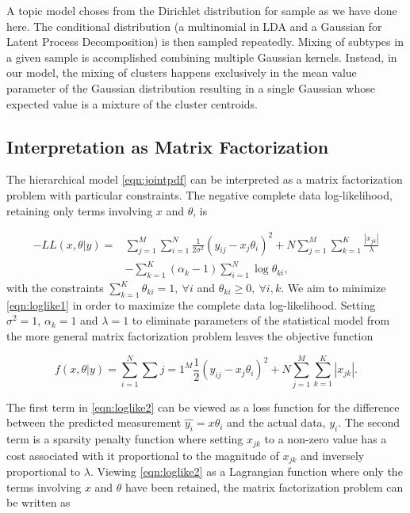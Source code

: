 \documentclass[11pt]{amsart}
\begin{document}
A topic model choses from the Dirichlet distribution for sample as we have done here. The conditional distribution (a multinomial in LDA and a Gaussian for Latent Process Decomposition) is then sampled repeatedly. Mixing of subtypes in a given sample is accomplished  combining multiple Gaussian kernels. Instead, in our model, the mixing of clusters happens exclusively in the mean value parameter of the Gaussian distribution resulting in a single Gaussian whose expected value is a mixture of the cluster centroids. 





\subsection {Interpretation as  Matrix Factorization}\label{subsec:matfac_interp}
The hierarchical model \eqref{eqn:jointpdf} can be interpreted as a matrix factorization problem with particular constraints. The negative complete data log-likelihood, retaining only terms involving $x$ and $\theta$, is

\begin{equation}\label{eqn:loglike1}
\begin{split}
-LL\left( x, \theta | y \right) = &\sum_{j=1}^M \sum_{i=1}^N \frac{1}{2 \sigma^2} \left( y_{ij} -x_j\theta_i \right)^2  + N\sum_{j=1}^M \sum_{k=1}^K \frac{|x_{jk}|}{\lambda}  \\
& - \sum_{k=1}^K \left( \alpha_k - 1 \right) \sum_{i=1}^N \log \theta_{ki},
\end{split}
\end{equation}
with the constraints $\sum_{k=1}^K \theta_{ki} = 1, \ \forall i$ and $\theta_{ki} \geq 0, \ \forall i,k$. We  aim to minimize \eqref{eqn:loglike1} in order to maximize the complete data log-likelihood. Setting $\sigma^2 = 1$, $\alpha_k=1$ and $\lambda=1$ to eliminate parameters of the statistical model from the more general matrix factorization problem leaves the objective function

\begin{equation}\label{eqn:loglike2}
f\left( x, \theta | y\right) = \sum_{i=1}^N \sum{j=1}^M \frac{1}{2} \left( y_{ij} -x_j\theta_i \right)^2 + N\sum_{j=1}^M \sum_{k=1}^K |x_{jk}|.
\end{equation}

The first term in \eqref{eqn:loglike2} can be viewed as a loss function for the difference between the predicted measurement $\hat{y_i} = x\theta_i$ and the actual data, $y_i$. The second term is a sparsity penalty function where setting $x_{jk}$ to a non-zero value has a cost associated with it proportional to the magnitude of $x_{jk}$ and inversely proportional to $\lambda$. Viewing \eqref{eqn:loglike2} as a Lagrangian function where only the terms involving $x$ and $\theta$ have been retained, the matrix factorization problem can be written as
\end{document}
